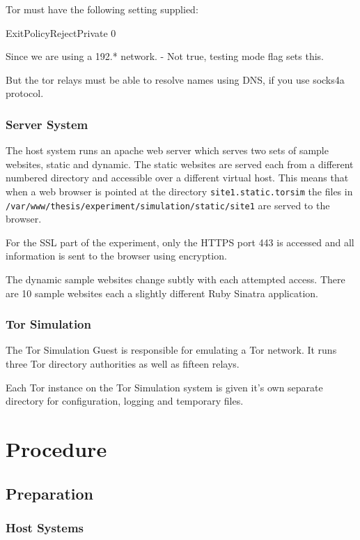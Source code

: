 Tor must have the following setting supplied:

ExitPolicyRejectPrivate 0

Since we are using a 192.* network. - Not true, testing mode flag sets this.

But the tor relays must be able to resolve names using DNS, if you use socks4a protocol.

\subsubsection{Server System}

The host system runs an apache web server which serves two sets of sample websites, static and dynamic. The static websites are served each from a different numbered directory and accessible over a different virtual host. This means that when a web browser is pointed at the directory \verb+site1.static.torsim+ the files in \verb+/var/www/thesis/experiment/simulation/static/site1+ are served to the browser.

For the SSL part of the experiment, only the HTTPS port 443 is accessed and all information is sent to the browser using encryption.

The dynamic sample websites change subtly with each attempted access. There are 10 sample websites each a slightly different Ruby Sinatra application.

\subsubsection{Tor Simulation}

The Tor Simulation Guest is responsible for emulating a Tor network. It runs three Tor directory authorities as well as fifteen relays.

Each Tor instance on the Tor Simulation system is given it's own separate directory for configuration, logging and temporary files.

\section{Procedure}

\subsection{Preparation}

\subsubsection{Host Systems}

